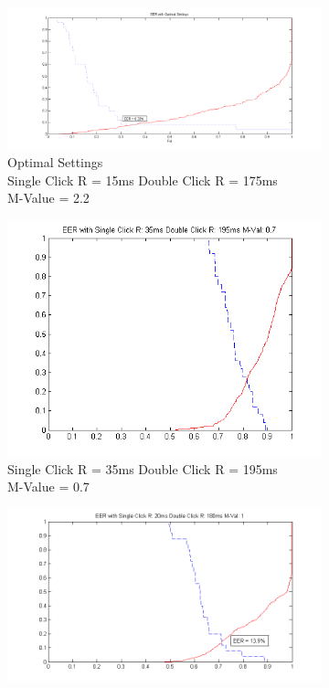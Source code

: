 \documentclass[conference]{IEEEtran}
\begin{document}
\begin{figure}[]
\begin{subfigure}{.5\textwidth}
  \centering
  \includegraphics[width=.8\linewidth]{Optimal}
  \caption{Optimal Settings\\Single Click R = 15ms Double Click R = 175ms\\M-Value = 2.2}
  \label{fig:sfig1}
\end{subfigure}%
\begin{subfigure}{.5\textwidth}
  \centering
  \includegraphics[width=.8\linewidth]{7M}
  \caption{Single Click R = 35ms Double Click R = 195ms\\M-Value = 0.7}
  \label{fig:sfig2}
\end{subfigure}
\begin{subfigure}{.5\textwidth}
  \centering
  \includegraphics[width=.8\linewidth]{M1}

\end{subfigure}
\end{figure}
\end{document}
